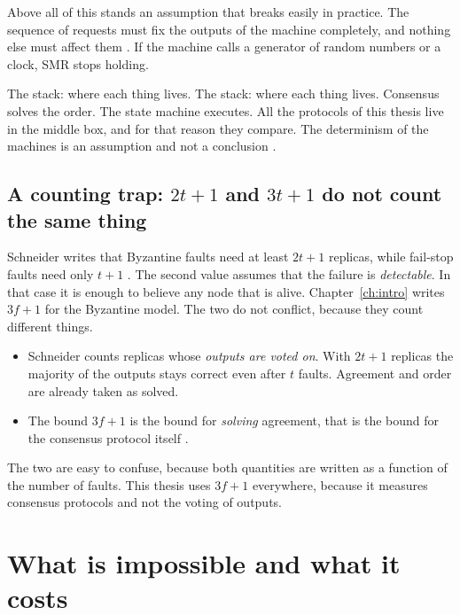 Above all of this stands an assumption that breaks easily in practice.
The sequence of requests must fix the outputs of the machine completely,
and nothing else must affect them \cite{schneider1990implementing}. If
the machine calls a generator of random numbers or a clock, SMR stops
holding.

%
{The stack: where each thing lives.}%
{The stack: where each thing lives. Consensus solves the order. The
state machine executes. All the protocols of this thesis live in the
middle box, and for that reason they compare. The determinism of the
machines is an assumption and not a conclusion
\cite{schneider1990implementing}.}%
{}

\subsection{A counting trap: $2t{+}1$ and $3t{+}1$ do not count the same
thing}

Schneider writes that Byzantine faults need at least $2t{+}1$ replicas,
while fail-stop faults need only $t{+}1$
\cite{schneider1990implementing}. The second value assumes that the
failure is \emph{detectable}. In that case it is enough to believe any
node that is alive. Chapter~\ref{ch:intro} writes $3f{+}1$ for the
Byzantine model. The two do not conflict, because they count different
things.

\begin{itemize}
  \item Schneider counts replicas whose \emph{outputs are voted on}.
  With $2t{+}1$ replicas the majority of the outputs stays correct even
  after $t$ faults. Agreement and order are already taken as solved.
  \item The bound $3f{+}1$ is the bound for \emph{solving} agreement,
  that is the bound for the consensus protocol itself
  \cite{pease1980reaching}.
\end{itemize}

The two are easy to confuse, because both quantities are written as a
function of the number of faults. This thesis uses $3f{+}1$ everywhere,
because it measures consensus protocols and not the voting of outputs.

\section{What is impossible and what it costs}
\label{sec:bounds}

